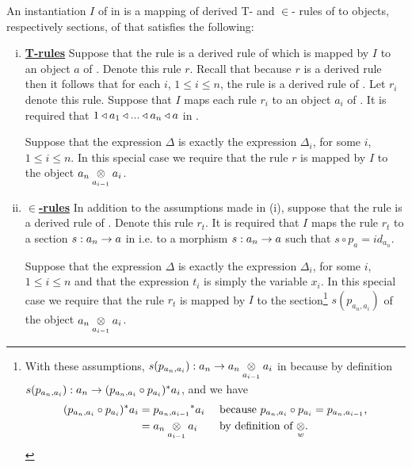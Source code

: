 

\begin{definition}
An instantiation $I$ of \gatUw in \catcw is a  mapping 
of derived T- and $\in$- rules of \gatUw to objects, respectively sections, of \gatUw that satisfies the following:
\begin{enumerate}[(i)]
\setlength\itemindent{2cm}
\item \underline{\textbf{T-rules}} 
Suppose that  the rule
 is a derived rule of \gatUw which is mapped by $I$ to an object $a$ of \catc. Denote this rule $r$. Recall that because $r$ is a derived rule then it follows  that for each $i$, 
$1 \leq i \leq n$, the rule  is a derived rule of \gatU. Let $r_i$ denote this rule.
Suppose that $I$ maps each rule $r_i$ to an object $a_i$ of \catcw.
It is required that $1 \base a_1 \base ... \base a_n \base a$ in \catc.

Suppose that the  expression $\Delta$ is exactly the expression $\Delta_i$, for some $i$, $1 \leq i \leq n$. In this special case we require that the rule $r$  is mapped by $I$ to the object 
$\crossx{a_n}{a_i}{a_{i-1}}$. 

\item \underline{\textbf{$\boldsymbol {\in}$-rules}} 
In addition to the assumptions made in (i),  suppose that the rule
 is a  derived rule of \gatU. 
Denote this rule $r_t$. It is required that $I$ maps the rule $r_t$ to a section
 $s:a_n \morph a$ in \catcw i.e. to a morphism $s:a_n \morph a$ such that $s \circ p_a = id_{a_n}$. 

Suppose that the  expression $\Delta$ is exactly the expression $\Delta_i$, for some $i$, $1 \leq i \leq n$ and that the expression $t_i$ is simply the variable $x_i$. 
In this special case we require that the rule $r_t$  is mapped by $I$ to the section\footnote{
With these assumptions, $s(p_{a_n,a_i}): a_n \morph \crossx{a_n}{a_i}{a_{i-1}}$ in \catcw because by definition  $s(p_{a_n,a_i}): a_n  \morph (p_{a_n,a_i} \circ p_{a_i})^*a_i$,
and we have 
\begin{align*}
(p_{a_n,a_i} \circ p_{a_i})^*a_i &= {p_{a_n,a_{i-1}}} ^* a_i  && \mbox{ because $p_{a_n,a_i} \circ p_{a_i}=p_{a_n,a_{i-1}}$,} \\
                                 &= \crossx{a_n}{a_i}{a_{i-1}} && \mbox{ by definition of $\crossx{}{}{w}$}.
\end{align*}
} %
$s(p_{a_n,a_i})$ of the object $\crossx{a_n}{a_i}{a_{i-1}}$. 


\end{enumerate}
\end{definition}
